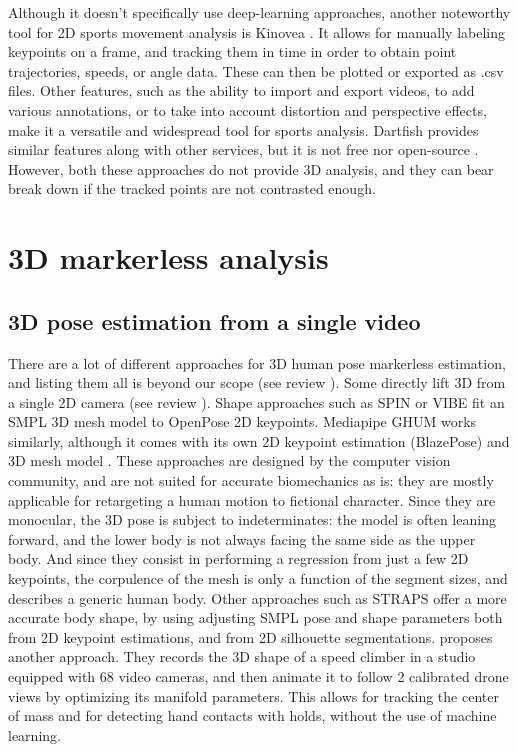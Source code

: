 Although it doesn't specifically use deep-learning approaches, another noteworthy tool for 2D sports movement analysis is Kinovea \cite{Kinovea2021,Fernandez2020}. It allows for manually labeling keypoints on a frame, and tracking them in time in order to obtain point trajectories, speeds, or angle data. These can then be plotted or exported as .csv files. Other features, such as the ability to import and export videos, to add various annotations, or to take into account distortion and perspective effects, make it a versatile and widespread tool for sports analysis. Dartfish provides similar features along with other services, but it is not free nor open-source \cite{Dartfish2022}. However, both these approaches do not provide 3D analysis, and they can bear break down if the tracked points are not contrasted enough.

\FloatBarrier
\section{3D markerless analysis} 
\subsection{3D pose estimation from a single video}

There are a lot of different approaches for 3D human pose markerless estimation, and listing them all is beyond our scope (see review \cite{Wang2021a}). Some directly lift 3D from a single 2D camera (see review \cite{Liu2022b}). Shape approaches such as SPIN \cite{Kolotouros2019} or VIBE \cite{Kocabas2020} fit an SMPL 3D mesh model \cite{Loper2015} to OpenPose 2D keypoints. Mediapipe GHUM works similarly, although it comes with its own 2D keypoint estimation (BlazePose) and 3D mesh model \cite{Xu2020b}. These approaches are designed by the computer vision community, and are not suited for accurate biomechanics as is: they are mostly applicable for retargeting a human motion to fictional character. Since they are monocular, the 3D pose is subject to indeterminates: the model is often leaning forward, and the lower body is not always facing the same side as the upper body. And since they consist in performing a regression from just a few 2D keypoints, the corpulence of the mesh is only a function of the segment sizes, and describes a generic human body. Other approaches such as STRAPS \cite{Sengupta2020} offer a more accurate body shape, by using adjusting SMPL pose and shape parameters both from 2D keypoint estimations, and from 2D silhouette segmentations. \cite{Reveret2020} proposes another approach. They records the 3D shape of a speed climber in a studio equipped with 68 video cameras, and then animate it to follow 2 calibrated drone views by optimizing its manifold parameters. This allows for tracking the center of mass and for detecting hand contacts with holds, without the use of machine learning. 

